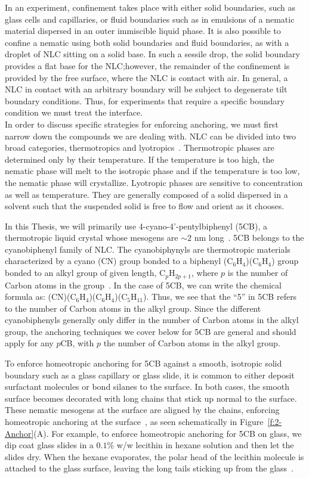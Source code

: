 In an experiment, confinement takes place with either solid boundaries, such as glass cells and capillaries, or fluid boundaries such as in emulsions of a nematic material dispersed in an outer immiscible liquid phase.
It is also possible to confine a nematic using both solid boundaries and fluid boundaries, as with a droplet of NLC sitting on a solid base.
In such a sessile drop, the solid boundary provides a flat base for the NLC;\@ however, the remainder of the confinement is provided by the free surface, where the NLC is contact with air.
In general, a NLC in contact with an arbitrary boundary will be subject to degenerate tilt boundary conditions.
Thus, for experiments that require a specific boundary condition we must treat the interface.\\

In order to discuss specific strategies for enforcing anchoring, we must first narrow down the compounds we are dealing with.
NLC can be divided into two broad categories, thermotropics and lyotropics~\cite{RN33}.
Thermotropic phases are determined only by their temperature.
If the temperature is too high, the nematic phase will melt to the isotropic phase and if the temperature is too low, the nematic phase will crystallize.
Lyotropic phases are sensitive to concentration as well as temperature.
They are generally composed of a solid dispersed in a solvent such that the suspended solid is free to flow and orient as it chooses.

In this Thesis, we will primarily use 4-cyano-4'-pentylbiphenyl (5CB), a thermotropic liquid crystal whose mesogens are $\sim 2$ nm long~\cite{RN33}.\@
5CB belongs to the cyanobiphenyl family of NLC.
The cyanobiphynyls are thermotropic materials characterized by a cyano (CN) group  bonded to a biphenyl (C$_6$H$_4$)(C$_6$H$_4$) group bonded to an alkyl group of given length, C$_p$H$_{2p+1}$, where $p$ is the number of Carbon atoms in the group~\cite{RN33}.
In the case of 5CB, we can write the chemical formula as: (CN)(C$_6$H$_4$)(C$_6$H$_4$)(C$_5$H$_{11}$).
Thus, we see that the ``5'' in 5CB refers to the number of Carbon atoms in the alkyl group.
Since the different cyanobiphenyls generally only differ in the number of Carbon atoms in the alkyl group, the anchoring techniques we cover below for 5CB are general and should apply for any $p$CB, with $p$ the number of Carbon atoms in the alkyl group.

To enforce homeotropic anchoring for 5CB against a smooth, isotropic solid boundary such as a glass capillary or glass slide, it is common to either deposit surfactant molecules or bond silanes to the surface.
In both cases, the smooth surface becomes decorated with long chains that stick up normal to the surface.
These nematic mesogens at the surface are aligned by the chains, enforcing homeotropic anchoring at the surface~\cite{RN33}, as seen schematically in Figure~\ref{f:2-Anchor}(A).
For example, to enforce homeotropic anchoring for 5CB on glass, we dip coat glass slides in a $0.1$\% w/w lecithin in hexane solution and then let the slides dry.
When the hexane evaporates, the polar head of the lecithin molecule is attached to the glass surface, leaving the long tails sticking up from the glass~\cite{RN140}.

